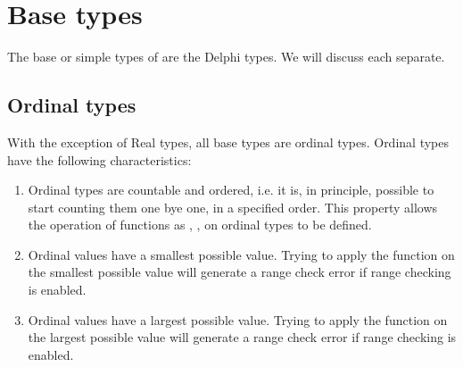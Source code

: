 \documentclass{report}
\begin{document}
\section{Base types}
The base or simple types of \fpc are the Delphi types.
We will discuss each separate.

\subsection{Ordinal types}
With the exception of Real types, all base types are ordinal types.
Ordinal types have the following characteristics:
\begin{enumerate}
\item Ordinal types are countable and ordered, i.e. it is, in principle,
possible to start counting them one bye one, in a specified order.
This property allows the operation of functions as , ,
on ordinal types to be defined.
\item Ordinal values have a smallest possible value. Trying to apply the
 function on the smallest possible value will generate a range
check error if range checking is enabled.
\item Ordinal values have a largest possible value. Trying to apply the
 function on the largest possible value will generate a range
check error if range checking is enabled.
\end{enumerate}
\end{document}
